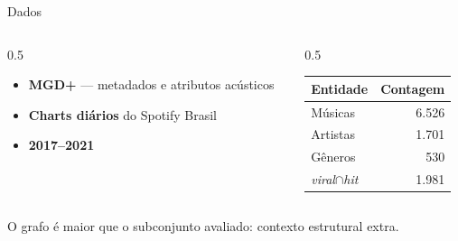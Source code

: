 \documentclass[aspectratio=169]{beamer}
\newcommand{\azul}[1]{\textcolor{ufprA}{\textbf{#1}}}
\begin{document}
\begin{frame}{Dados}
  \begin{columns}[T]
  \begin{column}{0.5\textwidth}
    \vspace{0.6em}
    \begin{itemize}
      \item \azul{MGD+} --- metadados e atributos acústicos
      \item \azul{Charts diários} do Spotify Brasil
      \item \azul{2017--2021}
    \end{itemize}
  \end{column}
  \begin{column}{0.5\textwidth}
    \begin{center}
    \begin{tabular}{lr}
    \toprule
    \textbf{Entidade} & \textbf{Contagem} \\
    \midrule
    Músicas & 6.526 \\
    Artistas & 1.701 \\
    Gêneros & 530 \\
    \midrule
    \emph{viral}$\cap$\emph{hit} & 1.981 \\
    \bottomrule
    \end{tabular}
    \end{center}
  \end{column}
  \end{columns}
  \vfill
  \begin{center}
  {\small O grafo é maior que o subconjunto avaliado: contexto estrutural extra.}
  \end{center}
  \vfill
\end{frame}
\end{document}
